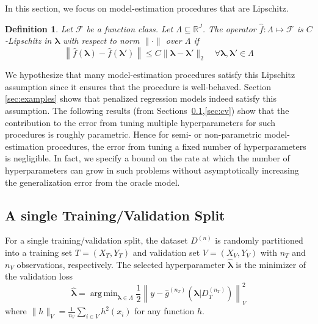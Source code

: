 \documentclass[12pt]{article}
\newtheorem{definition}{Definition}
\DeclareMathOperator*{\argmin}{arg\,min}
\begin{document}
In this section, we focus on model-estimation procedures that are Lipschitz.
\begin{definition}
	\label{def:smooth_funcs}
	Let $\mathcal{F}$ be a function class. Let $\Lambda \subseteq \mathbb{R}^J$.
	The operator $\hat{f}: \Lambda \mapsto \mathcal{F}$ is $C$-Lipschitz in $\boldsymbol{\lambda}$ with respect to norm $\| \cdot \|$ over $\Lambda$ if
	\begin{equation}
	\left \| \hat{f}(\boldsymbol \lambda) - \hat{f}(\boldsymbol \lambda ') \right \|
	\le
	C \| \boldsymbol \lambda - \boldsymbol \lambda' \|_2 
	\quad
	\forall \boldsymbol \lambda,\boldsymbol \lambda' \in \Lambda
	\label{eq:smooth_funcs}
	\end{equation}
\end{definition}
We hypothesize that many model-estimation procedures satisfy this Lipschitz assumption since it ensures that the procedure is well-behaved. Section \ref{sec:examples} shows that penalized regression models indeed satisfy this assumption. The following results (from Sections~\ref{sec:single},\ref{sec:cv}) show that the contribution to the error from tuning multiple hyperparameters for such procedures is roughly parametric. Hence for semi- or non-parametric model-estimation procedures, the error from tuning a fixed number of hyperparameters is negligible. In fact, we specify a bound on the rate at which the number of hyperparameters can grow in such problems without asymptotically increasing the generalization error from the oracle model.

\subsection{A single Training/Validation Split}\label{sec:single}

For a single training/validation split, the dataset $D^{(n)}$ is randomly partitioned into a training set $T = (X_T, Y_T)$ and validation set $V = (X_V, Y_V)$ with $n_T$ and $n_V$ observations, respectively. The selected hyperparameter $\hat{\boldsymbol{\lambda}}$ is the minimizer of the validation loss
\begin{equation}
\label{eq:train_val_lambda}
\hat{\boldsymbol \lambda} = \argmin_{\boldsymbol{\lambda} \in\Lambda} \frac{1}{2} \left \| y-\hat{g}^{(n_T)}( \boldsymbol \lambda | D_T^{(n_T)}) \right \|_{V}^{2}
\end{equation}
where $\| h \|_{V}=\frac{1}{n_V}\sum_{i\in V} h^2(x_i)$ for any function $h$. 
\end{document}
